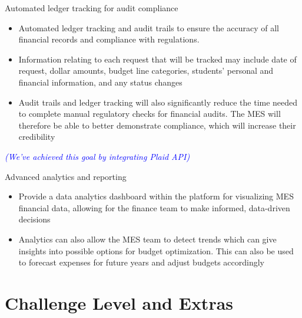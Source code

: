 \documentclass{article}
\begin{document}
\begin{itemize}
    {\color{blue}%
        \item Automated ledger tracking for audit compliance
        \begin{itemize}
            \item Automated ledger tracking and audit trails to ensure the accuracy of all financial records and compliance with regulations.
            \item Information relating to each request that will be tracked may include date of request, dollar amounts, budget line categories, students' personal and financial information, and any status changes
            \item Audit trails and ledger tracking will also significantly reduce the time needed to complete manual regulatory checks for financial audits. The MES will therefore be able to better demonstrate compliance, which will increase their credibility
        \end{itemize}%

        \emph{\textcolor{blue}{(We've achieved this goal by integrating Plaid API)}}
    }
    \item Advanced analytics and reporting
    \begin{itemize}
        \item Provide a data analytics dashboard within the platform for visualizing MES financial data, allowing for the finance team to make informed, data-driven decisions 
        \item Analytics can also allow the MES team to detect trends which can give insights into possible options for budget optimization. This can also be used to forecast expenses for future years and adjust budgets accordingly
    \end{itemize}
    \end{itemize}

\section{Challenge Level and Extras}

\end{document}
